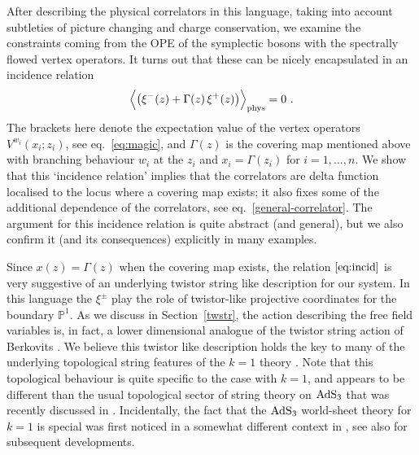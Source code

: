 \documentclass[a4paper,11pt]{article}
\numberwithin{equation}{section}
\begin{document}
After describing the physical correlators in this language, taking into account subtleties of picture changing and charge conservation, we examine the constraints coming from the OPE of the symplectic bosons with the spectrally flowed vertex operators. It turns out that these can be nicely encapsulated in an incidence relation 
\begin{equation}
\Big{\langle} \bigl(\xi^-(z)+\Gamma(z)\, \xi^+(z)\bigr)\Big{\rangle}_{\rm phys} =0 \ .
\label{eq:incid}
\end{equation}
The brackets here denote the expectation value of the vertex operators $V^{w_i}(x_i;z_i)$, see eq.~\eqref{eq:magic}, and 
$\Gamma(z)$ is the covering map mentioned above with branching behaviour $w_i$ at the $z_i$ and 
$x_i=\Gamma(z_i)$ for $i=1,\ldots, n$. We show that this `incidence relation' implies that the correlators are  delta function localised to the locus where a covering map exists; it also fixes some of the additional dependence of the correlators, see eq.~\eqref{general-correlator}. The argument for this incidence relation is quite abstract (and general), but we also confirm it (and its consequences) explicitly in many examples. 

Since $x(z)=\Gamma(z)$ when the covering map exists,  the relation $\eqref{eq:incid}$ is very suggestive of an underlying twistor string like description for our system. In this language the $\xi^{\pm}$ play the role of twistor-like projective coordinates for the boundary $\mathbb{P}^1$. As we discuss in Section~\ref{twstr}, the action describing the free field variables is, in fact, a lower dimensional analogue of the twistor string action of Berkovits \cite{Berkovits:2004hg}. We believe this twistor like description holds the key to many of the underlying topological string features of the $k=1$ theory \cite{GG}.  Note that this topological behaviour is quite specific to the case with $k=1$, and appears to be different than the usual topological sector of string theory on ${\rm AdS}_3$ that was recently discussed in \cite{Costello:2020jbh,Li:2020nei}. Incidentally, the fact that the ${\rm AdS}_3$ world-sheet theory for $k=1$ is special was first noticed in a somewhat different context in \cite{Giveon:2005mi}, see also \cite{Giribet:2018ada} for subsequent developments.
\smallskip
\end{document}

